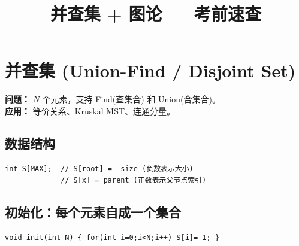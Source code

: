 \documentclass[10pt,a4paper]{article}
\title{\textbf{并查集 + 图论 — 考前速查}}
\author{}\date{}
\begin{document}
\maketitle\vspace{-8pt}

\section*{并查集 (Union-Find / Disjoint Set)}

\textbf{问题：} $N$ 个元素，支持 Find(查集合) 和 Union(合集合)。\\
\textbf{应用：} 等价关系、Kruskal MST、连通分量。

\subsection*{数据结构}

\begin{lstlisting}
int S[MAX];  // S[root] = -size (负数表示大小)
             // S[x] = parent (正数表示父节点索引)
\end{lstlisting}

\subsection*{初始化：每个元素自成一个集合}

\begin{lstlisting}
void init(int N) { for(int i=0;i<N;i++) S[i]=-1; }
\end{lstlisting}
\end{document}
